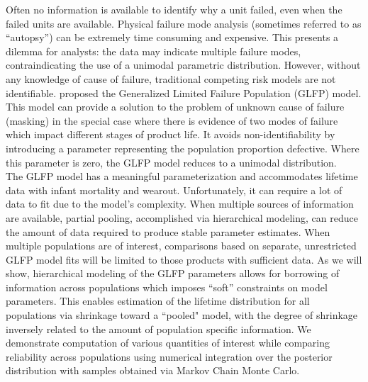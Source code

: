 \documentclass[aap]{imsart}
\begin{document}
Often no information is available to identify why a unit failed, even when the failed units are available. Physical failure mode analysis (sometimes referred to as ``autopsy'') can be extremely time consuming and expensive. This presents a dilemma for analysts: the data may indicate multiple failure modes, contraindicating the use of a unimodal parametric distribution. However, without any knowledge of cause of failure, traditional competing risk models are not identifiable. \citet{chan} proposed the Generalized Limited Failure Population (GLFP) model. This model can provide a solution to the problem of unknown cause of failure (masking) in the special case where there is evidence of two modes of failure which impact different stages of product life. It avoids non-identifiability by introducing a parameter representing the population proportion defective. Where this parameter is zero, the GLFP model reduces to a unimodal distribution. \\

The GLFP model has a meaningful parameterization and accommodates lifetime data with infant mortality and wearout.  Unfortunately, it can require a lot of data to fit due to the model's complexity. When multiple sources of information are available, partial pooling, accomplished via hierarchical modeling, can reduce the amount of data required to produce stable parameter estimates. When multiple populations are of interest, comparisons based on separate, unrestricted GLFP model fits will be limited to those products with sufficient data. As we will show, hierarchical modeling of the GLFP parameters allows for borrowing of information across populations which imposes ``soft'' constraints on model parameters. This enables estimation of the lifetime distribution for all populations via shrinkage toward a ``pooled" model, with the degree of shrinkage inversely related to the amount of population specific information. We demonstrate computation of various quantities of interest while comparing reliability across populations using numerical integration over the posterior distribution with samples obtained via  Markov Chain Monte Carlo.
\end{document}
